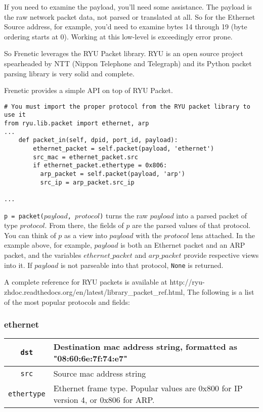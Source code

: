 If you need to examine the payload, you'll need some assistance.
The payload is the raw network packet data, not parsed or translated at all.
So for the Ethernet Source address, for example, you'd need to examine bytes 14 through 19 
(byte ordering starts at 0).  
Working at this low-level is exceedingly error prone.

So Frenetic leverages the RYU Packet library.
RYU is an open source project spearheaded by NTT (Nippon Telephone and Telegraph) and its Python packet
parsing library is very solid and complete.

Frenetic provides a simple API on top of RYU Packet.

\begin{verbatim}
# You must import the proper protocol from the RYU packet library to use it
from ryu.lib.packet import ethernet, arp
...
    def packet_in(self, dpid, port_id, payload):
        ethernet_packet = self.packet(payload, 'ethernet')
        src_mac = ethernet_packet.src
        if ethernet_packet.ethertype = 0x806:
          arp_packet = self.packet(payload, 'arp')
          src_ip = arp_packet.src_ip

...
\end{verbatim}

\texttt{p = packet($payload$, $protocol$)} turns the raw $payload$ into a parsed packet of type $protocol$.  
From there, the fields of $p$ are the parsed values of that protocol.  
You can think of $p$ as a view into $payload$ with the $protocol$ lens attached.  
In the example above, for example, $payload$ is both an Ethernet packet and an ARP packet, and the 
variables $ethernet\_packet$ and $arp\_packet$ provide respective views into it.   
If $payload$ is not parseable into that protocol, \texttt{None} is returned.  

A complete reference for RYU packets is available at 
http://ryu-zhdoc.readthedocs.org/en/latest/library\_packet\_ref.html, 
The following is a list of the most popular protocols and fields:

\subsubsection{ethernet}

\bigskip
\begin{tabularx}{6in}{|c|X|}
\hline\hline
\texttt{dst} & Destination mac address string, formatted as "08:60:6e:7f:74:e7" 
\\ \hline
\texttt{src} & Source mac address string 
\\ \hline
\texttt{ethertype} & Ethernet frame type.  
Popular values are 0x800 for IP version 4, or 0x806 for ARP.  
\\ \hline\hline
\end{tabularx}

